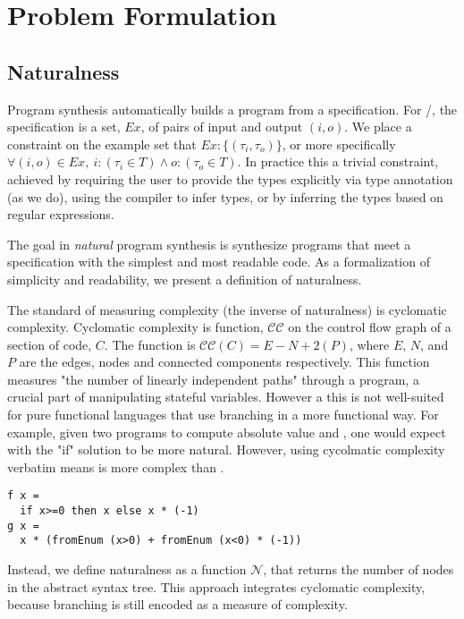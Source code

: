 \section{Problem Formulation}
\label{problem}

\subsection{Naturalness}
\label{sec:naturalness}

Program synthesis automatically builds a program from a specification.
For \ourTool/, the specification is a set, $Ex$, of pairs of input and output $(i,o)$.
We place a constraint on the example set that $Ex:\{(\tau_i,\tau_o)\}$, or more specifically $\forall (i,o) \in Ex,\ i:(\tau_i \in T) \land o:(\tau_o \in T)$.
In practice this a trivial constraint, achieved by requiring the user to provide the types explicitly via type annotation (as we do), using the compiler to infer types\cite{ghc}, or by inferring the types \cite{gulwani_popl15} based on regular expressions.

The goal in \textit{natural} program synthesis is synthesize programs that meet a specification with the simplest and most readable code.
As a formalization of simplicity and readability, we present a definition of naturalness.

The standard of measuring complexity (the inverse of naturalness) is cyclomatic complexity\cite{cyclo}.
Cyclomatic complexity is function, $\mathcal{CC}$ on the control flow graph of a section of code, $C$.
The function is $\mathcal{CC}(C) = E − N + 2(P)$, where $E$, $N$, and $P$ are the edges, nodes and connected components respectively.
This function measures "the number of linearly independent paths" through a program, a crucial part of manipulating stateful variables.
However a this is not well-suited for pure functional languages that use branching in a more functional way.
For example, given two programs to compute absolute value  and , one would expect  with the "if" solution to be more natural.
However, using cycolmatic complexity verbatim means  is more complex than .

\begin{lstlisting}
f x =
  if x>=0 then x else x * (-1)
g x = 
  x * (fromEnum (x>0) + fromEnum (x<0) * (-1))
\end{lstlisting}

Instead, we define naturalness as a function $\mathcal{N}$, that returns the number of nodes in the abstract syntax tree.
This approach integrates cyclomatic complexity, because branching is still encoded as a measure of complexity.

